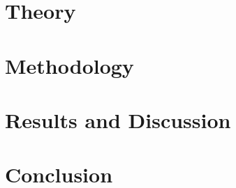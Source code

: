 \documentclass[12pt]{article}
\begin{document}

\vspace{4.5cm}

\section{Theory} \label{sec:1}

\cite{rian}


\section{Methodology} \label{sec:2}



\section{Results and Discussion} \label{sec:3}



\section{Conclusion} \label{sec:4}



\newpage



 \label{sec:ref}

\vspace{1.5cm}

\listoffigures
\end{document}
